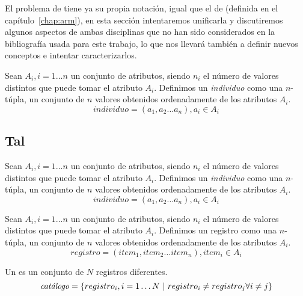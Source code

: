 El problema de \Clasificacion tiene ya su propia notación, igual que el de \arm (definida en el capítulo~\ref{chap:arm}), en esta sección intentaremos unificarla y discutiremos algunos aspectos de ambas disciplinas que no han sido considerados en la bibliografía usada para este trabajo, lo que nos llevará también a definir nuevos conceptos e intentar caracterizarlos.


\begin{Definition}[Individuo]
   Sean $A_i, i = 1 \ldots n$ un conjunto de atributos, siendo $n_i$ el número de valores distintos que puede tomar el atributo $A_i$. Definimos un \emph{individuo} como una $n$-túpla, un conjunto de $n$ valores obtenidos ordenadamente de los atributos $A_i$.
   $$individuo = \left(a_1, a_2\ldots a_n\right), a_i \in A_i$$
\label{def:individuo}
\end{Definition}






\subsection{Tal}
\label{sec:clasificacion:conceptos-basicos:tal}
%

\begin{Definition}[Individuo]
   Sean $A_i, i = 1 \ldots n$ un conjunto de atributos, siendo $n_i$ el número de valores distintos que puede tomar el atributo $A_i$. Definimos un \emph{individuo} como una $n$-túpla, un conjunto de $n$ valores obtenidos ordenadamente de los atributos $A_i$.
   $$individuo = \left(a_1, a_2\ldots a_n\right), a_i \in A_i$$
\label{def:individuo}
\end{Definition}


\begin{Definition}[Registro]
   Sean $A_i, i = 1 \ldots n$ un conjunto de atributos, siendo $n_i$ el número de valores distintos que puede tomar el atributo $A_i$. Definimos un registro como una $n$-túpla, un conjunto de $n$ valores obtenidos ordenadamente de los atributos $A_i$.
   $$registro = \left(item_1, item_2\ldots item_n\right), item_i \in A_i$$
\label{def:registro}
\end{Definition}

\begin{Definition}[\Catalogo] Un \catalogo es un conjunto de $N$ registros diferentes.
   $$\catalogo = \left\{registro_i, i = 1\ldots N\ | \ registro_i \neq registro_j \forall i \neq j\right\}$$
\label{def:catalogo}
\end{Definition}
